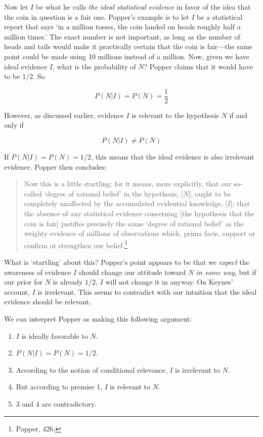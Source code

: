 Now let \(I\) be what he calls \emph{the ideal statistical evidence} in
favor of the idea that the coin in question is a fair one. Popper's
example is to let \(I\) be a statistical report that says `in a million
tosses, the coin landed on heads roughly half a million times.' The
exact number is not important, as long as the number of heads and tails
would make it practically certain that the coin is fair---the same point
could be made using 10 millions instead of a million. Now, given we have
ideal evidence \(I\), what is the probability of \(N\)? Popper claims
that it would have to be \(1/2\). So

\[P (N|I) = P(N) = \frac{1}{2}\]

\noindent However, as discussed earlier, evidence \(I\) is relevant to
the hypothesis \(N\) if and only if

\[ P(N|I) \neq P(N) \]

\noindent If \(P(N|I) = P(N) = 1/2\), this means that the ideal evidence
is also irrelevant evidence. Popper then concludes:

\begin{quote}
Now this is a little startling; for it means, more explicitly, that our
so-called `degree of rational belief' in the hypothesis, {[}\(N\){]},
ought to be completely unaffected by the accumulated evidential
knowledge, {[}\(I\){]}; that the absence of any statistical evidence
concerning {[}the hypothesis that the coin is fair{]} justifies
precisely the same `degree of rational belief' as the weighty evidence
of millions of observations which, prima facie, support or confirm or
strengthen our belief.\footnote{Popper, 426.}
\end{quote}

What is `startling' about this? Popper's point appears to be that we
\emph{expect} the awareness of evidence \(I\) should change our attitude
toward \(N\) \emph{in some way}, but if our prior for \(N\) is already
\(1/2\), \(I\) will not change it in anyway. On Keynes' account,
\(I\) is irrelevant. This seems to contradict with our intuition that
the ideal evidence should be relevant.

We can interpret Popper as making this following argument:

\begin{enumerate}
\def\labelenumi{\arabic{enumi}.}
\tightlist
\item
  \(I\) is ideally favorable to \(N\).
\item
  \(P(N|I) = P(N) = 1/2\).
\item
  According to the notion of conditional relevance, \(I\) is irrelevant
  to \(N\).
\item
  But according to premise 1, \(I\) is relevant to \(N\).
\item
  3 and 4 are contradictory.
\end{enumerate}


